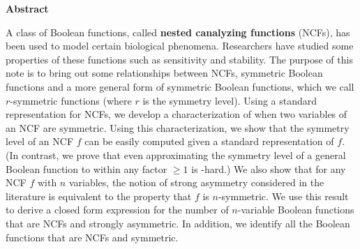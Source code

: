 \vspace*{-0.05in}
\begin{center}
\textbf{Abstract}  
\end{center}

\smallskip

A class of Boolean functions, 
called \textbf{nested canalyzing functions} (NCFs),
has been used to model certain biological phenomena.
Researchers have studied some properties of these functions
such as sensitivity and stability.
The purpose of this note is to bring out some relationships between NCFs, symmetric 
Boolean functions and a more general form of symmetric Boolean functions,
which we call $r$-symmetric functions (where $r$ is the symmetry level).
Using a standard representation for NCFs, we develop a 
characterization of when two variables of an NCF are symmetric.
Using this characterization, we show 
that the symmetry level of an NCF $f$
can be easily computed given a standard representation of $f$.
(In contrast, we prove that even approximating the symmetry level of
a general Boolean function to within any factor $\geq 1$ is \cnp-hard.) 
We also show that for any NCF $f$ with $n$ variables, the notion of
strong asymmetry considered in the literature is equivalent to
the property that $f$ is $n$-symmetric. 
We use this result to derive a closed form expression for the
number of $n$-variable Boolean functions 
that are NCFs and strongly asymmetric.
In addition, we identify all the Boolean functions that are NCFs 
and symmetric. 
